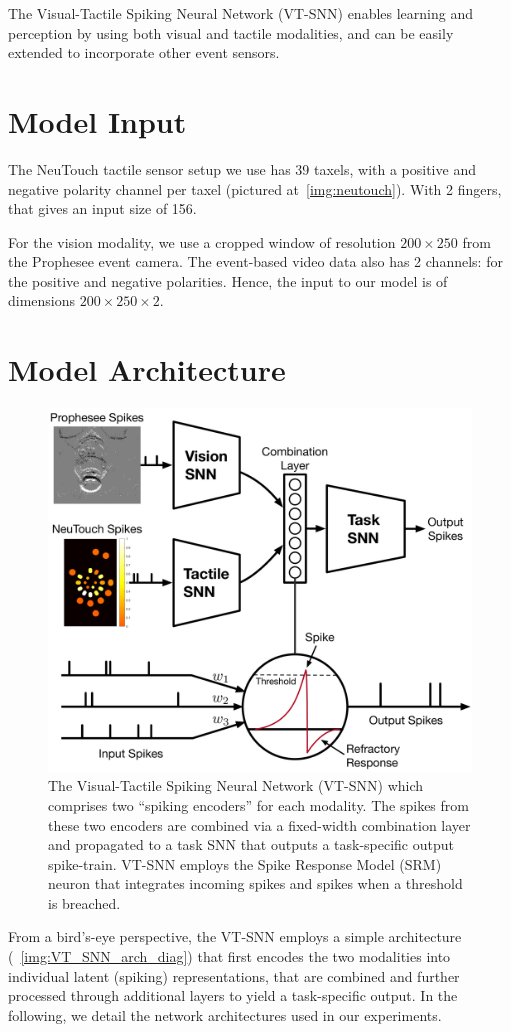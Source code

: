 \documentclass[fyp]{socreport}
\begin{document}
The Visual-Tactile Spiking Neural Network (VT-SNN) enables learning and
perception by using both visual and tactile modalities, and can be easily
extended to incorporate other event sensors.

\section{Model Input}

The NeuTouch tactile sensor setup we use has 39 taxels, with a positive and
negative polarity channel per taxel (pictured at~\autoref{img:neutouch}).
With 2 fingers, that gives an input size of 156.

For the vision modality, we use a cropped window of resolution $200 \times 250$
from the Prophesee event camera. The event-based video data also has 2 channels:
for the positive and negative polarities. Hence, the input to our model is of
dimensions $200 \times 250 \times 2$.

\section{Model Architecture}

\begin{figure}
  \centering
  \includegraphics[width=0.45\columnwidth]{images/VT-SNN_v3.pdf}
  \caption{The Visual-Tactile Spiking Neural Network (VT-SNN) which comprises
    two ``spiking encoders'' for each modality. The spikes from these two
    encoders are combined via a fixed-width combination layer and propagated to
    a task SNN that outputs a task-specific output spike-train. VT-SNN employs
    the Spike Response Model (SRM) neuron that integrates incoming spikes and
    spikes when a threshold is breached.\label{img:VT_SNN_arch_diag}}
\end{figure}

From a bird's-eye perspective, the VT-SNN employs a simple architecture
(~\autoref{img:VT_SNN_arch_diag}) that first encodes the two modalities into
individual latent (spiking) representations, that are combined and further
processed through additional layers to yield a task-specific output. In the
following, we detail the network architectures used in our experiments.
\end{document}
